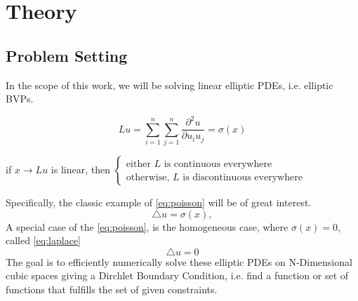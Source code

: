 \chapter{Theory}
\label{chapter:Theory}
%

\section{Problem Setting}
In the scope of this work, we will be solving
 linear elliptic PDEs, i.e. elliptic \glspl{BVP}.
\begin{definition}
$$Lu = \sum_{i=1}^{n}\sum_{j=1}^{n} %
\frac{\partial^{2}u}{\partial u_{i}u_{j}}=\sigma(x)$$
\cite{Gilbarg2015}
\end{definition}
\begin{remark}
  if $x \rightarrow Lu$ is linear, then
  $\begin{cases}
      \text{either $L$ is continuous everywhere} \\
      \text{otherwise, $L$ is discontinuous everywhere}
    \end{cases}$ \cite{Bornemann}
\end{remark}
  Specifically, the classic example of \ref{eq:poisson} will be of great interest.
  \begin{equation}
  \tag{Poisson's Equation} \bigtriangleup u = \sigma(x), \label{eq:poisson}
  \end{equation}
A special case of the \ref{eq:poisson}, is the homogeneous case, where $\sigma(x) = 0$, called
\ref{eq:laplace}
  \begin{equation}
    \tag{Laplace's Equation}
    \bigtriangleup u = 0
    \label{eq:laplace}
  \end{equation}
The goal is to efficiently numerically solve these elliptic \Glspl{PDE} on N-Dimensional cubic spaces giving a Dirchlet
Boundary Condition, i.e. find a function or set of functions that fulfills the set of given constraints.
